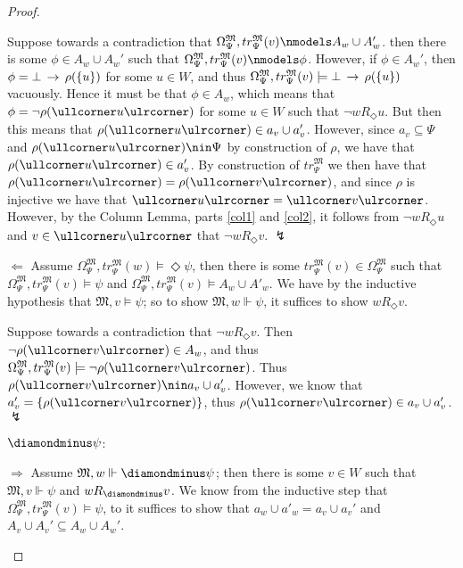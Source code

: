 \documentclass[11pt]{article}
\newcommand{\DD}{\diamondminus}
\newcommand{\Pos}{\Diamond}
\newcommand{\lc}{\ullcorner}
\newcommand{\rc}{\ulrcorner}
\begin{document}
\begin{proof}
\begin{peano}
\begin{peano}
	Suppose towards a contradiction that $\Omega_{\Psi}^\mathfrak{M}, tr_{\Psi}^\mathfrak{M}(v) \nmodels A_w \cup A_w'$.  then there is some $\phi \in A_w \cup A_w'$ such that $\Omega_{\Psi}^\mathfrak{M}, tr_{\Psi}^\mathfrak{M}(v) \nmodels \phi$.  However, if $\phi \in A_w'$, then $\phi = \bot \,\rightarrow\, \rho(\{u\})$ for some $u \in W$, and thus $\Omega_{\Psi}^\mathfrak{M}, tr_{\Psi}^\mathfrak{M}(v) \models \bot \,\rightarrow\, \rho(\{u\})$ vacuously.  Hence it must be that $\phi \in A_w$, which means that $\phi = \neg\rho(\lc u \rc)$ for some $u \in W$ such that $\neg w R_\Pos u$.  But then this means that $\rho(\lc u \rc) \in a_v \cup a'_v$.  However, since $a_v \subseteq \Psi$ and $\rho(\lc u \rc) \nin \Psi$ by construction of $\rho$, we have that $\rho(\lc u \rc) \in a'_v$.  By construction of $tr^\mathfrak{M}_\Psi$ we then have that $ \rho(\lc u \rc) = \rho(\lc v \rc)$, and since $\rho$ is injective we have that $\lc u \rc = \lc v \rc$.  However, by the Column Lemma, parts \ref{col1} and \ref{col2}, it follows from $\neg w R_\Pos u$ and $v \in \lc u \rc$ that $\neg w R_\Pos v$. $\lightning$
	
	\item $\Leftarrow$ Assume $\Omega_{\Psi}^\mathfrak{M}, tr_{\Psi}^\mathfrak{M}(w) \models \Pos \psi$, then there is some  $tr_{\Psi}^\mathfrak{M}(v) \in \Omega_{\Psi}^\mathfrak{M}$ such that $\Omega_{\Psi}^\mathfrak{M}, tr_{\Psi}^\mathfrak{M}(v) \models \psi$ and $\Omega_{\Psi}^\mathfrak{M}, tr_{\Psi}^\mathfrak{M}(v) \models A_w \cup A'_w$.  We have by the inductive hypothesis that $\mathfrak{M}, v \models \psi$; so to show $\mathfrak{M}, w \Vdash \psi$, it suffices to show $w R_\Pos v$.
	
	Suppose towards a contradiction that $\neg w R_\Pos v$.  Then $\neg \rho(\lc v \rc) \in A_w$, and thus $\Omega_{\Psi}^\mathfrak{M}, tr_{\Psi}^\mathfrak{M}(v) \models \neg \rho(\lc v \rc)$.  Thus $\rho(\lc v \rc) \nin a_v \cup a'_v$.  However, we know that $a'_v = \{ \rho(\lc v \rc) \}$, thus $\rho(\lc v \rc) \in a_v \cup a'_v$. $\lightning$
 \end{peano}
 \item $\DD \psi$:
 \begin{peano}
 	\item $\Rightarrow$ Assume $\mathfrak{M},w \Vdash \DD \psi$; then there is some $v \in W$ such that $\mathfrak{M},v \Vdash \psi$ and $w R_\DD v$.  We know from the inductive step that $\Omega_{\Psi}^\mathfrak{M}, tr_{\Psi}^\mathfrak{M}(v) \models \psi$, to it suffices to show that $a_w \cup a'_w = a_v \cup a_v'$ and $A_v \cup A_v' \subseteq A_w \cup A_w'$.
	

\end{peano}
\end{peano}
\end{proof}
\end{document}
